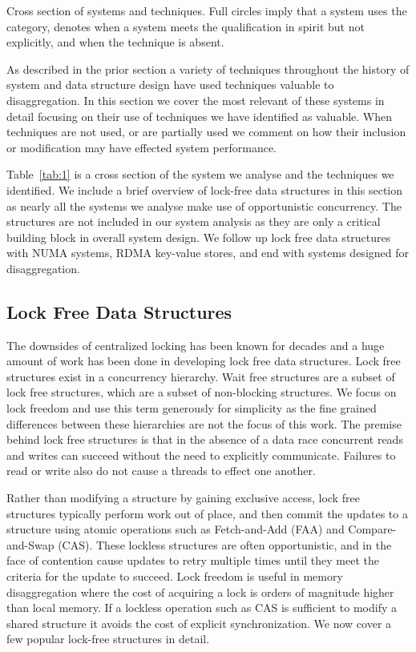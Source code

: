 \begin{table}[h]
    \caption{Cross section of systems and techniques. Full circles
    \fullcirc imply that a system uses the category, \halfcirc denotes when a
    system meets the qualification in spirit but not explicitly, and \nullcirc
    when the technique is absent.}
    
    \label{tab:1}
\end{table}

As described in the prior section a variety of techniques throughout the history
of system and data structure design have used techniques valuable to
disaggregation. In this section we cover the most relevant of these systems in
detail focusing on their use of techniques we have identified as valuable. When
techniques are not used, or are partially used we comment on how their inclusion
or modification may have effected system performance.

Table~\ref{tab:1} is a cross section of the system we analyse and the techniques
we identified. We include a brief overview of lock-free data structures in this
section as nearly all the systems we analyse make use of opportunistic
concurrency. The structures are not included in our system analysis as they are
only a critical building block in overall system design. We follow up lock free
data structures with NUMA systems, RDMA key-value stores, and end with systems
designed for disaggregation.

\subsection{Lock Free Data Structures}

The downsides of centralized locking has been known for decades and a huge
amount of work has been done in developing lock free data structures. Lock free
structures exist in a concurrency hierarchy. Wait free structures are a subset
of lock free structures, which are a subset of non-blocking structures. We focus
on lock freedom and use this term generously for simplicity as the fine grained
differences between these hierarchies are not the focus of this work.  The
premise behind lock free structures is that in the absence of a data race
concurrent reads and writes can succeed without the need to explicitly
communicate. Failures to read or write also do not cause a threads to effect one
another.

Rather than modifying a structure by gaining exclusive access, lock free
structures typically perform work out of place, and then commit the updates to a
structure using atomic operations such as Fetch-and-Add (FAA) and
Compare-and-Swap (CAS). These lockless structures are often opportunistic, and
in the face of contention cause updates to retry multiple times until they meet
the criteria for the update to succeed. Lock freedom is useful in memory
disaggregation where the cost of acquiring a lock is orders of magnitude higher
than local memory. If a lockless operation such as CAS is sufficient to modify a
shared structure it avoids the cost of explicit synchronization. We now cover a
few popular lock-free structures in detail.

